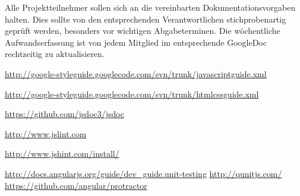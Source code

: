 Alle Projektteilnehmer sollen sich an die vereinbarten Dokumentationsvorgaben halten. Dies sollte von den entsprechenden Verantwortlichen stichprobenartig geprüft werden, besonders vor wichtigen Abgabeterminen. Die wöchentliche Aufwandserfassung ist von jedem Mitglied im entsprechende GoogleDoc rechtzeitig zu aktualisieren.



\begin{thebibliography}{99}

  \url{http://google-styleguide.googlecode.com/svn/trunk/javascriptguide.xml}

  \url{http://google-styleguide.googlecode.com/svn/trunk/htmlcssguide.xml}

  \url{https://github.com/jsdoc3/jsdoc}

\url{http://www.jslint.com}

\url{http://www.jshint.com/install/}

\bibitem{[1]} \url{http://docs.angularjs.org/guide/dev_guide.unit-testing}
\bibitem{[2]} \url{http://qunitjs.com/}
\bibitem{[3]} \url{https://github.com/angular/protractor}

\end{thebibliography}

